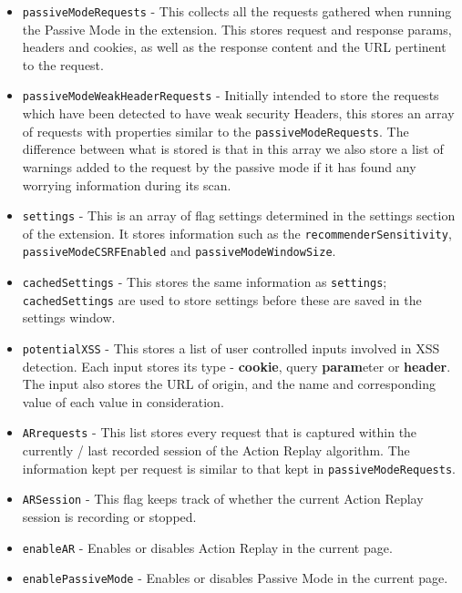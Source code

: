 \begin{itemize}
	\item \texttt{passiveModeRequests} - This collects all the requests gathered when running the Passive Mode in the extension. This stores request and response params, headers and cookies, as well as the response content and the URL pertinent to the request.
	
	\item \texttt{passiveModeWeakHeaderRequests} - Initially intended to store the requests which have been detected to have weak security Headers, this stores an array of requests with properties similar to the \texttt{passiveModeRequests}. The difference between what is stored is that in this array we also store a list of warnings added to the request by the passive mode if it has found any worrying information during its scan.
	
	\item \texttt{settings} - This is an array of flag settings determined in the settings section of the extension. It stores information such as the \texttt{recommenderSensitivity}, \texttt{passiveModeCSRFEnabled} and \texttt{passiveModeWindowSize}.
	
	\item \texttt{cachedSettings} - This stores the same information as \texttt{settings}; \texttt{cachedSettings} are used to store settings before these are saved in the settings window.
	
	\item \texttt{potentialXSS} - This stores a list of user controlled inputs involved in XSS detection. Each input stores its type - \textbf{cookie}, query \textbf{param}eter or \textbf{header}. The input also stores the URL of origin, and the name and corresponding value of each value in consideration.
	
	\item \texttt{ARrequests} - This list stores every request that is captured within the currently / last recorded session of the Action Replay algorithm. The information kept per request is similar to that kept in \texttt{passiveModeRequests}.
	
	\item \texttt{ARSession} - This flag keeps track of whether the current Action Replay session is recording or stopped.
	
	\item \texttt{enableAR} - Enables or disables Action Replay in the current page.
	
	\item \texttt{enablePassiveMode} - Enables or disables Passive Mode in the current page.
	
\end{itemize}

